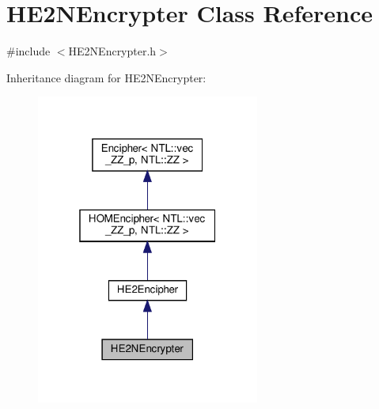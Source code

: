 \hypertarget{classHE2NEncrypter}{}\section{H\+E2\+N\+Encrypter Class Reference}
\label{classHE2NEncrypter}


{\ttfamily \#include $<$H\+E2\+N\+Encrypter.\+h$>$}



Inheritance diagram for H\+E2\+N\+Encrypter\+:
\nopagebreak
\begin{figure}[H]
\begin{center}
\leavevmode
\includegraphics[width=208pt]{classHE2NEncrypter__inherit__graph}
\end{center}
\end{figure}


